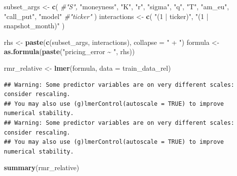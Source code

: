 \documentclass[
]{article}
\newenvironment{Shaded}{\begin{snugshade}}{\end{snugshade}}
\newcommand{\AttributeTok}[1]{\textcolor[rgb]{0.13,0.29,0.53}{#1}}
\newcommand{\CommentTok}[1]{\textcolor[rgb]{0.56,0.35,0.01}{\textit{#1}}}
\newcommand{\FunctionTok}[1]{\textcolor[rgb]{0.13,0.29,0.53}{\textbf{#1}}}
\newcommand{\NormalTok}[1]{#1}
\newcommand{\OtherTok}[1]{\textcolor[rgb]{0.56,0.35,0.01}{#1}}
\newcommand{\StringTok}[1]{\textcolor[rgb]{0.31,0.60,0.02}{#1}}
\begin{document}
\begin{Shaded}
\begin{Highlighting}[]
\NormalTok{subset\_args }\OtherTok{\textless{}{-}} \FunctionTok{c}\NormalTok{(}
  \CommentTok{\#"S",}
  \StringTok{"moneyness"}\NormalTok{,}
  \StringTok{"K"}\NormalTok{,}
  \StringTok{"r"}\NormalTok{,}
  \StringTok{"sigma"}\NormalTok{,}
  \StringTok{"q"}\NormalTok{,}
  \StringTok{"T"}\NormalTok{,}
  \StringTok{"am\_eu"}\NormalTok{,}
  \StringTok{"call\_put"}\NormalTok{,}
  \StringTok{"model"}
  \CommentTok{\#"ticker"}
\NormalTok{)}
\NormalTok{interactions }\OtherTok{\textless{}{-}} \FunctionTok{c}\NormalTok{(}
  \StringTok{"(1 | ticker)"}\NormalTok{,}
  \StringTok{"(1 | snapshot\_month)"}
\NormalTok{)}

\NormalTok{rhs }\OtherTok{\textless{}{-}} \FunctionTok{paste}\NormalTok{(}\FunctionTok{c}\NormalTok{(subset\_args, interactions), }\AttributeTok{collapse =} \StringTok{" + "}\NormalTok{)}
\NormalTok{formula }\OtherTok{\textless{}{-}} \FunctionTok{as.formula}\NormalTok{(}\FunctionTok{paste}\NormalTok{(}\StringTok{"pricing\_error \textasciitilde{} "}\NormalTok{, rhs))}

\NormalTok{rmr\_relative }\OtherTok{\textless{}{-}} \FunctionTok{lmer}\NormalTok{(formula, }\AttributeTok{data =}\NormalTok{ train\_data\_rel)}
\end{Highlighting}
\end{Shaded}

\begin{verbatim}
## Warning: Some predictor variables are on very different scales: consider rescaling. 
## You may also use (g)lmerControl(autoscale = TRUE) to improve numerical stability.
## Warning: Some predictor variables are on very different scales: consider rescaling. 
## You may also use (g)lmerControl(autoscale = TRUE) to improve numerical stability.
\end{verbatim}

\begin{Shaded}
\begin{Highlighting}[]
\FunctionTok{summary}\NormalTok{(rmr\_relative)}
\end{Highlighting}
\end{Shaded}
\end{document}

